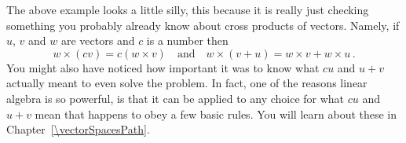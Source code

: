 \begin{example}
\end{example} 
The above example looks a little silly, this because it is really just checking something you probably already know about cross products of vectors. Namely, if $u$, $v$ and $w$ are vectors and $c$ is a number then
\[
w\times(cv)=c(w\times v)\quad\mbox{and}\quad  w\times(v+u)=w\times v+w\times u\, .
\]
You might also have noticed how important it was to know what $cu$ and $u+v$ actually meant to even solve the problem.
In fact, one of the reasons linear algebra is so powerful, is that it can be applied to any choice for what $cu$ and $u+v$ mean
that happens to obey a few basic rules. You will learn about these in Chapter~\ref{\vectorSpacesPath}.

